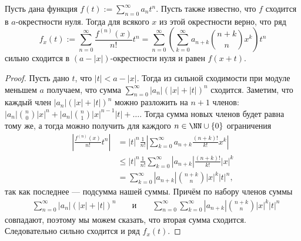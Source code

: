 \documentclass[12pt,a4paper]{article}
\begin{document}
    \begin{lemma}
        Пусть дана функция $f(t) := \sum_{n=0}^\infty a_n t^n$. Пусть также известно, что $f$ сходится в $a$-окрестности нуля. Тогда для всякого $x$ из этой окрестности верно, что ряд
        \[f_x(t) := \sum_{n=0}^\infty \frac{f^{(n)}(x)}{n!} t^n = \sum_{n=0}^\infty \left(\sum_{k=0}^\infty a_{n+k} \binom{n+k}{n} x^k\right) t^n\]
        сильно сходится в $(a-|x|)$-окрестности нуля и равен $f(x+t)$.
    \end{lemma}

    \begin{proof}
        Пусть дано $t$, что $|t| < a - |x|$. Тогда из сильной сходимости при модуле меньшем $a$ получаем, что сумма $\sum_{n=0}^\infty |a_n| (|x| + |t|)^n$ сходится. Заметим, что каждый член $|a_n| (|x| + |t|)^n$ можно разложить на $n+1$ членов: $|a_n| \binom{n}{0} |x|^n + |a_n| \binom{n}{1} |x|^{n-1} |t| + \dots$. Тогда сумма новых членов будет равна тому же, а тогда можно получить для каждого $n \in \NN \cup \{0\}$ ограничения
        \begin{align*}
            \left|\frac{f^{(n)}(x)}{n!} t^n\right|
            &= |t|^n \frac{1}{n!} \left|\sum_{k=0}^\infty a_{n+k} \frac{(n+k)!}{k!} x^k\right|\\
            &\leqslant |t|^n \frac{1}{n!} \sum_{k=0}^\infty |a_{n+k}| \frac{(n+k)!}{k!} |x|^k\\
            &= \sum_{k=0}^\infty |a_{n+k}| \binom{n+k}{n} |x|^k |t|^n,
        \end{align*}
        так как последнее --- подсумма нашей суммы. Причём по набору членов суммы
        \begin{align*}
            &\sum_{n=0}^\infty |a_n| (|x| + |t|)^n&
            &\text{ и }&
            &\sum_{n=0}^\infty \sum_{k=0}^\infty |a_{n+k}| \binom{n+k}{n} |x|^k |t|^n
        \end{align*}
        совпадают, поэтому мы можем сказать, что вторая сумма сходится. Следовательно сильно сходится и ряд $f_x(t)$.


\end{proof}
\end{document}
